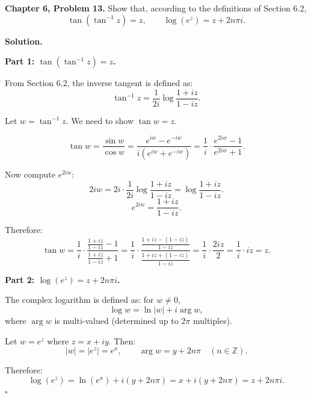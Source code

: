 \documentclass[12pt]{article}
\begin{document}
\textbf{Chapter 6, Problem 13.} Show that, according to the definitions of Section 6.2,
\[
\tan(\tan^{-1} z) = z, \qquad \log(e^z) = z + 2n\pi i.
\]

\bigskip
\textbf{Solution.}

\textbf{Part 1: $\tan(\tan^{-1}z) = z$.}

From Section 6.2, the inverse tangent is defined as:
\[
\tan^{-1}z = \frac{1}{2i}\log\frac{1+iz}{1-iz}.
\]

Let $w = \tan^{-1}z$. We need to show $\tan w = z$.

\[
\tan w = \frac{\sin w}{\cos w} = \frac{e^{iw}-e^{-iw}}{i(e^{iw}+e^{-iw})} = \frac{1}{i}\cdot\frac{e^{2iw}-1}{e^{2iw}+1}.
\]

Now compute $e^{2iw}$:
\[
2iw = 2i \cdot \frac{1}{2i}\log\frac{1+iz}{1-iz} = \log\frac{1+iz}{1-iz}.
\]
\[
e^{2iw} = \frac{1+iz}{1-iz}.
\]

Therefore:
\[
\tan w = \frac{1}{i}\cdot\frac{\frac{1+iz}{1-iz}-1}{\frac{1+iz}{1-iz}+1} = \frac{1}{i}\cdot\frac{\frac{1+iz-(1-iz)}{1-iz}}{\frac{1+iz+(1-iz)}{1-iz}} = \frac{1}{i}\cdot\frac{2iz}{2} = \frac{1}{i}\cdot iz = z.
\]

\bigskip
\textbf{Part 2: $\log(e^z) = z + 2n\pi i$.}

The complex logarithm is defined as: for $w \neq 0$,
\[
\log w = \ln|w| + i\arg w,
\]
where $\arg w$ is multi-valued (determined up to $2\pi$ multiples).

Let $w = e^z$ where $z = x + iy$. Then:
\[
|w| = |e^z| = e^x, \qquad \arg w = y + 2n\pi \quad (n \in \mathbb{Z}).
\]

Therefore:
\[
\log(e^z) = \ln(e^x) + i(y + 2n\pi) = x + i(y+2n\pi) = z + 2n\pi i.
\]
\hfill $\square$
\end{document}
